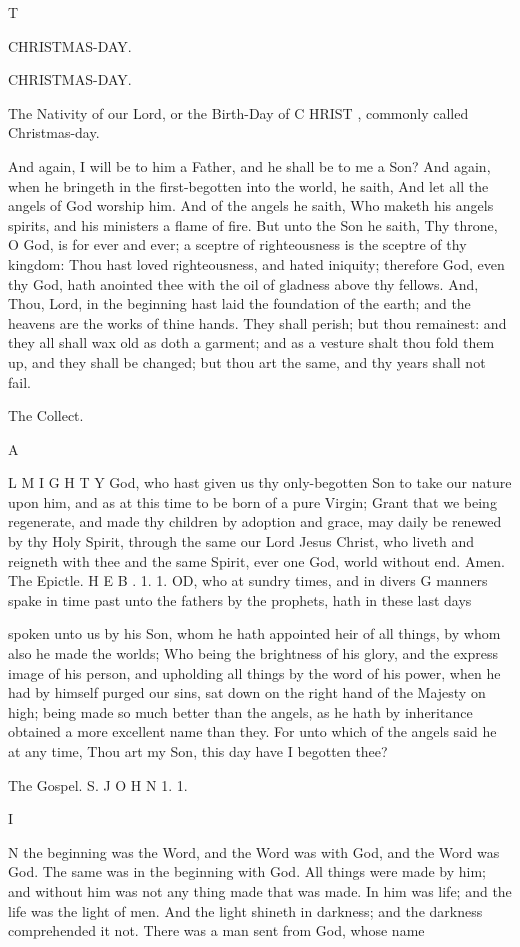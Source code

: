 T

CHRISTMAS-DAY.

CHRISTMAS-DAY.

The Nativity of our Lord, or the Birth-Day of C HRIST , commonly called Christmas-day.

And again, I will be to him a Father, and he shall be to me a Son? And again, when he bringeth in the first-begotten into the world, he saith, And let all the angels of God worship him. And of the angels he saith, Who maketh his angels spirits, and his ministers a flame of fire. But unto the Son he saith, Thy throne, O God, is for ever and ever; a sceptre of righteousness is the sceptre of thy kingdom: Thou hast loved righteousness, and hated iniquity; therefore God, even thy God, hath anointed thee with the oil of gladness above thy fellows. And, Thou, Lord, in the beginning hast laid the foundation of the earth; and the heavens are the works of thine hands. They shall perish; but thou remainest: and they all shall wax old as doth a garment; and as a vesture shalt thou fold them up, and they shall be changed; but thou art the same, and thy years shall not fail.

The Collect.

A

L M I G H T Y God, who hast given us thy only-begotten Son to take our nature upon him, and as at this time to be born of a pure Virgin; Grant that we being regenerate, and made thy children by adoption and grace, may daily be renewed by thy Holy Spirit, through the same our Lord Jesus Christ, who liveth and reigneth with thee and the same Spirit, ever one God, world without end. Amen. The Epictle. H E B . 1. 1. OD, who at sundry times, and in divers G manners spake in time past unto the fathers by the prophets, hath in these last days

spoken unto us by his Son, whom he hath appointed heir of all things, by whom also he made the worlds; Who being the brightness of his glory, and the express image of his person, and upholding all things by the word of his power, when he had by himself purged our sins, sat down on the right hand of the Majesty on high; being made so much better than the angels, as he hath by inheritance obtained a more excellent name than they. For unto which of the angels said he at any time, Thou art my Son, this day have I begotten thee?

The Gospel. S. J O H N 1. 1.

I

N the beginning was the Word, and the Word was with God, and the Word was God. The same was in the beginning with God. All things were made by him; and without him was not any thing made that was made. In him was life; and the life was the light of men. And the light shineth in darkness; and the darkness comprehended it not. There was a man sent from God, whose name

